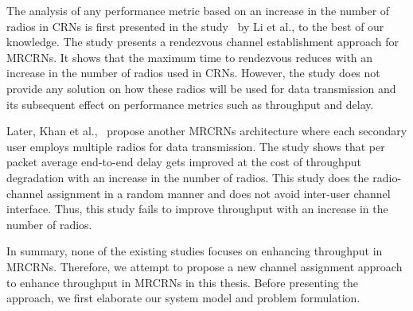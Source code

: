 The analysis of any performance metric based on an increase in the number of radios in CRNs is first presented in the study~\cite{li2014deterministic} by Li et al., to the best of our knowledge. The study presents a rendezvous channel establishment approach for MRCRNs. It shows that the maximum time to rendezvous reduces with an increase in the number of radios used in CRNs. However, the study does not provide any solution on how these radios will be used for data transmission and its subsequent effect on performance metrics such as throughput and delay.

Later, Khan et al.,~\cite{khan2015towards} propose another MRCRNs architecture where each secondary user employs multiple radios for data transmission. The study shows that per packet average end-to-end delay gets improved at the cost of throughput degradation with an increase in the number of radios. This study does the radio-channel assignment in a random manner and does not avoid inter-user channel interface. Thus, this study fails to improve throughput with an increase in the number of radios.

In summary, none of the existing studies focuses on enhancing throughput in MRCRNs. Therefore, we attempt to propose a new channel assignment approach to enhance throughput in MRCRNs in this thesis. Before presenting the approach, we first elaborate our system model and problem formulation.
\endinput
